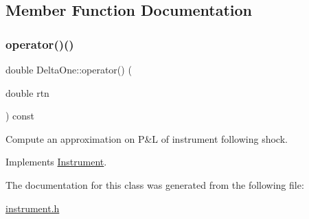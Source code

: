\subsection{Member Function Documentation}
\hypertarget{classDeltaOne_a8dd4b5243412ab399b07c1128262f570}{}\label{classDeltaOne_a8dd4b5243412ab399b07c1128262f570} 
\subsubsection{\texorpdfstring{operator()()}{operator()()}}
{\footnotesize\ttfamily double Delta\+One\+::operator() (\begin{DoxyParamCaption}\item[{double}]{rtn }\end{DoxyParamCaption}) const\hspace{0.3cm}{\ttfamily [virtual]}}



Compute an approximation on P\&L of instrument following shock. 



Implements \hyperlink{classInstrument_a33b6faccaeb494858dee5c547de897b6}{Instrument}.



The documentation for this class was generated from the following file\+:\begin{DoxyCompactItemize}
\item 
\hyperlink{instrument_8h}{instrument.\+h}\end{DoxyCompactItemize}
